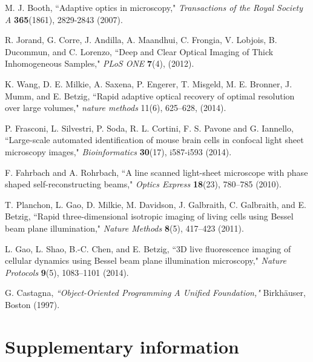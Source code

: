 \documentclass[12pt]{spieman}  %
\begin{document}
\begin{thebibliography}{0}
 M. J. Booth, ``Adaptive optics in microscopy," \emph{Transactions of the Royal Society A} \textbf{365}(1861), 2829-2843 (2007).

 R. Jorand, G. Corre, J. Andilla, A. Maandhui, C. Frongia, V. Lobjois, B. Ducommun, and C. Lorenzo, ``Deep and Clear Optical Imaging of Thick Inhomogeneous Samples," \emph{PLoS ONE} \textbf{7}(4), (2012).

 K. Wang, D. E. Milkie, A. Saxena, P. Engerer, T. Misgeld, M. E. Bronner, J. Mumm, and E. Betzig, ``Rapid adaptive optical recovery of optimal resolution over large volumes," \emph{nature methods} 11(6), 625–628, (2014).

 P. Frasconi, L. Silvestri, P. Soda, R. L. Cortini, F. S. Pavone and G. Iannello, ``Large-scale automated identification of mouse brain cells in confocal light sheet microscopy images," \emph{Bioinformatics} \textbf{30}(17), i587-i593 (2014).

 F. Fahrbach and A. Rohrbach, ``A line scanned light-sheet microscope with phase shaped self-reconstructing beams," \emph{Optics Express} \textbf{18}(23), 780–785 (2010).

 T. Planchon, L. Gao, D. Milkie, M. Davidson, J. Galbraith, C. Galbraith, and E. Betzig, ``Rapid three-dimensional isotropic imaging of living cells using Bessel beam plane illumination," \emph{Nature Methods} \textbf{8}(5), 417–423 (2011).

 L. Gao, L. Shao, B.-C. Chen, and E. Betzig, ``3D live fluorescence imaging of cellular dynamics using Bessel beam plane illumination microscopy," \emph{Nature Protocols} \textbf{9}(5), 1083–1101 (2014).



 G. Castagna, \emph{``Object-Oriented Programming A Unified Foundation,"} Birkh{\"a}user, Boston (1997).

\end{thebibliography}





\pagebreak
\section{Supplementary information}
\end{document}
